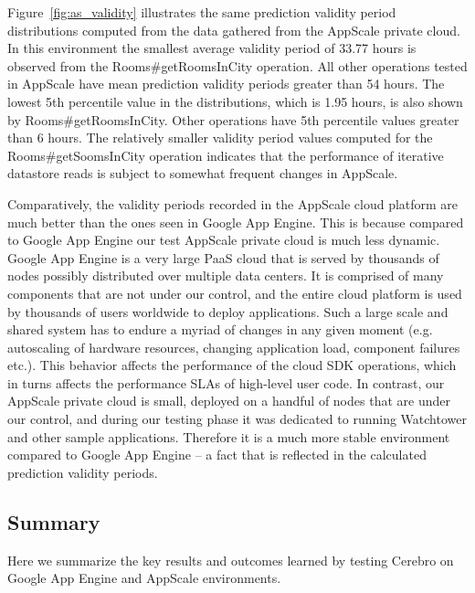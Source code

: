 Figure~\ref{fig:as_validity} illustrates the same prediction validity period distributions computed from the data gathered from
the AppScale private cloud. In this environment the smallest average validity period of 33.77 hours is observed from the
Rooms\#getRoomsInCity operation. All other operations tested in AppScale have mean prediction validity periods greater
than 54 hours. The lowest 5th percentile value in the distributions, which is 1.95 hours, is also shown by Rooms\#getRoomsInCity.
Other operations have 5th percentile values greater than 6 hours. The relatively smaller validity period values computed for the
Rooms\#getSoomsInCity operation indicates that the performance of iterative datastore reads is subject to somewhat frequent changes 
in AppScale.

Comparatively, the validity periods recorded in the AppScale
cloud platform are much better than the ones seen in Google App Engine. This is because compared to Google App Engine our
test AppScale private cloud is much less dynamic. Google App Engine is a very large PaaS cloud that is served by thousands of
nodes possibly distributed over multiple data centers. It is comprised of many components that are not under our control,
and the entire cloud platform is used by thousands of users worldwide to deploy applications. Such a large scale and
shared system has to endure a myriad of changes in any given moment (e.g. autoscaling of hardware resources, 
changing application load, component failures etc.). This behavior affects the performance of the cloud SDK operations, which
in turns affects the performance SLAs of high-level user code. In contrast, our AppScale
private cloud is small, deployed on a handful of nodes that are under our control, and during our testing phase it was dedicated
to running Watchtower and other sample applications. Therefore it is a much more stable environment compared to Google 
App Engine -- a fact that is reflected in the calculated prediction validity periods. 

\subsection{Summary}
Here we summarize the key results and outcomes learned by testing Cerebro on Google App Engine and AppScale environments.

